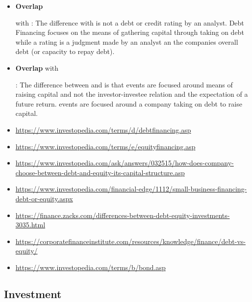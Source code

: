 \begin{itemize}[noitemsep,leftmargin=*]
    \item \hypertarget{financingvsratingdebt}{\textbf{Overlap}} with : The difference with  is not a debt or credit rating by an analyst. Debt Financing focuses on the means of gathering capital through taking on debt while a rating is a judgment made by an analyst an the companies overall debt (or capacity to repay debt).
	\item \hypertarget{financingvsinvestment}{\textbf{Overlap} with }: The difference between  and  is that  events are focused around means of raising capital and not the investor-investee relation and the expectation of a future return.  events are focused around a company taking on debt to raise capital.
    \item \url{https://www.investopedia.com/terms/d/debtfinancing.asp}
    \item \url{https://www.investopedia.com/terms/e/equityfinancing.asp}
    \item \url{https://www.investopedia.com/ask/answers/032515/how-does-company-choose-between-debt-and-equity-its-capital-structure.asp}
    \item \url{https://www.investopedia.com/financial-edge/1112/small-business-financing-debt-or-equity.aspx}
    \item \url{https://finance.zacks.com/differences-between-debt-equity-investments-3035.html}
    \item \url{https://corporatefinanceinstitute.com/resources/knowledge/finance/debt-vs-equity/}
    \item \url{https://www.investopedia.com/terms/b/bond.asp}
\end{itemize}

\vspace{0.5cm}

\subsection{Investment}

